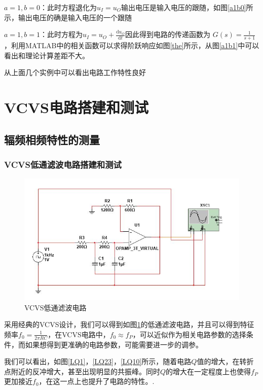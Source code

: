 \documentclass[UTF8,a4paper]{paper}
\begin{document}
$a=1,b=0$：此时方程退化为$u_I=u_O$输出电压是输入电压的跟随，如图\ref{a1b0}所示，输出电压的确是输入电压的一个跟随

$a=1,b=1$：此时方程为$u_I=u_O+\frac{\mathrm{d}u_O}{\mathrm{d}t}$因此得到电路的传递函数为
$G(s)=\frac{1}{s+1}$，利用MATLAB中的相关函数可以求得阶跃响应如图\ref{the}所示，从图\ref{a1b1}中可以看出和理论计算差距不大。

从上面几个实例中可以看出电路工作特性良好
\section{VCVS电路搭建和测试}
\subsection{辐频相频特性的测量}
\subsubsection{VCVS低通滤波电路搭建和测试}
\begin{figure}[h]
\centering
\includegraphics[width=\textwidth]{L.jpg}
\caption{VCVS低通滤波电路}
\label{L}
\end{figure}

采用经典的VCVS设计，我们可以得到如图\ref{L}的低通滤波电路，并且可以得到特征频率$f_0=\frac{1}{2\pi RC}$，在VCVS电路中，$f_0\approx f_P$，可以近似作为相关电路参数的选择条件，而如果想得到更准确的电路参数，可能需要进一步的调参。

我们可以看出，如图\ref{LQ1}，\ref{LQ23}，\ref{LQ10}所示，随着电路$Q$值的增大，在转折点附近的反冲增大，甚至出现明显的共振峰。同时$Q$的增大在一定程度上也使得$f_P$更加接近$f_0$，在这一点上也提升了电路的特性。.
\end{document}
